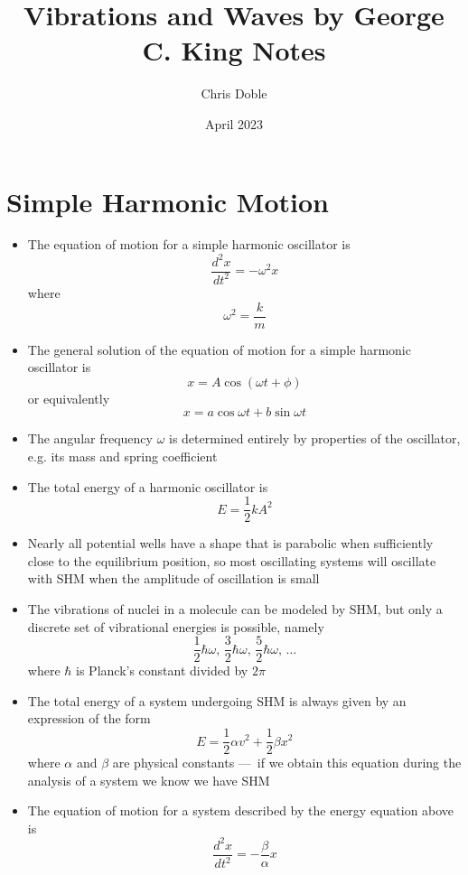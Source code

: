 \documentclass{article}
\title{Vibrations and Waves by George C. King Notes}
\author{Chris Doble}
\date{April 2023}
\begin{document}
\maketitle

\tableofcontents

\section{Simple Harmonic Motion}

\begin{itemize}
  \item The equation of motion for a simple harmonic oscillator is \[\frac{d^2 x}{d t^2} = -\omega^2 x\] where \[\omega^2 = \frac{k}{m}\]

  \item The general solution of the equation of motion for a simple harmonic oscillator is \[x = A \cos (\omega t + \phi)\] or equivalently \[x = a \cos \omega t + b \sin \omega t\]

  \item The angular frequency $\omega$ is determined entirely by properties of the oscillator, e.g. its mass and spring coefficient

  \item The total energy of a harmonic oscillator is \[E = \frac{1}{2} k A^2\]

  \item Nearly all potential wells have a shape that is parabolic when sufficiently close to the equilibrium position, so most oscillating systems will oscillate with SHM when the amplitude of oscillation is small

  \item The vibrations of nuclei in a molecule can be modeled by SHM, but only a discrete set of vibrational energies is possible, namely \[\frac{1}{2} \hbar \omega, \, \frac{3}{2} \hbar \omega, \, \frac{5}{2} \hbar \omega, \, \ldots\] where $\hbar$ is Planck's constant divided by $2 \pi$

  \item The total energy of a system undergoing SHM is always given by an expression of the form \[E = \frac{1}{2} \alpha v^2 + \frac{1}{2} \beta x^2\] where $\alpha$ and $\beta$ are physical constants — if we obtain this equation during the analysis of a system we know we have SHM

  \item The equation of motion for a system described by the energy equation above is \[\frac{d^2 x}{d t^2} = -\frac{\beta}{\alpha} x\]
\end{itemize}
\end{document}
